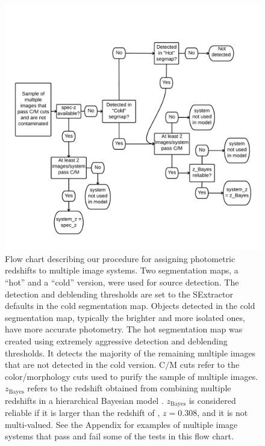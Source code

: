 \begin{figure}
    \centering
    \includegraphics[width=.8\textwidth]{fig/Photo-z_flow_chart.pdf}
    \caption[Flow chart describing our procedure for assigning photometric redshifts to multiple image
    systems.]{Flow chart describing our procedure for assigning photometric redshifts to multiple image systems.
    Two segmentation maps, a ``hot'' and a ``cold'' version, were used for source detection. The detection and
    deblending thresholds are set to the SExtractor defaults in the cold segmentation map. Objects detected in
    the cold segmentation map, typically the brighter and more isolated ones, have more accurate photometry. The
    hot segmentation map was created using extremely aggressive detection and deblending thresholds. It detects
    the majority of the remaining multiple images that are not detected in the cold version.
    $\textrm{C}/\textrm{M}$ cuts refer to the color/morphology cuts used to purify the sample of multiple images.
    $z_{\mathrm{Bayes}}$ refers to the redshift obtained from combining multiple redshifts in a hierarchical
    Bayesian model \citep{Dahlen:2013p33380}. $z_{\mathrm{Bayes}}$ is considered reliable if it is larger than
    the redshift of \cler, $z=0.308$, and it is not multi-valued. See the Appendix for examples of multiple image
    systems that pass and fail some of the tests in this flow chart. }
    \label{fig:flow_chart}
\end{figure} 

